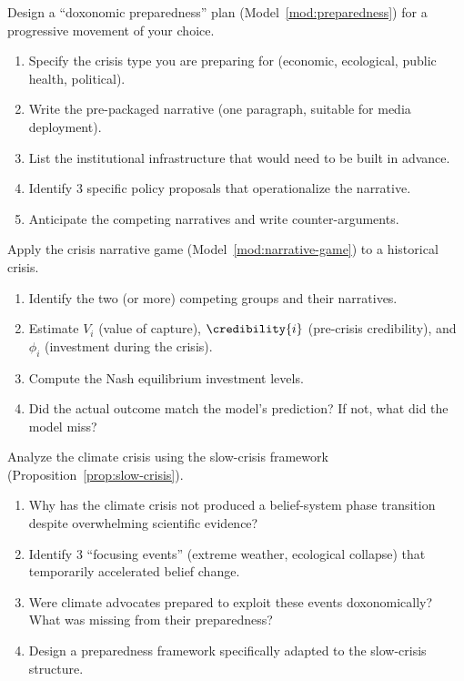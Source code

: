 \begin{exercise}
Design a ``doxonomic preparedness'' plan (Model~\ref{mod:preparedness}) for a progressive movement of your choice.
\begin{enumerate}[nosep]
  \item Specify the crisis type you are preparing for (economic, ecological, public health, political).
  \item Write the pre-packaged narrative (one paragraph, suitable for media deployment).
  \item List the institutional infrastructure that would need to be built in advance.
  \item Identify 3 specific policy proposals that operationalize the narrative.
  \item Anticipate the competing narratives and write counter-arguments.
\end{enumerate}
\end{exercise}

\begin{exercise}
Apply the crisis narrative game (Model~\ref{mod:narrative-game}) to a historical crisis.
\begin{enumerate}[nosep]
  \item Identify the two (or more) competing groups and their narratives.
  \item Estimate $V_i$ (value of capture), $\credibility{i}$ (pre-crisis credibility), and $\phi_i$ (investment during the crisis).
  \item Compute the Nash equilibrium investment levels.
  \item Did the actual outcome match the model's prediction? If not, what did the model miss?
\end{enumerate}
\end{exercise}

\begin{exercise}
Analyze the climate crisis using the slow-crisis framework (Proposition~\ref{prop:slow-crisis}).
\begin{enumerate}[nosep]
  \item Why has the climate crisis not produced a belief-system phase transition despite overwhelming scientific evidence?
  \item Identify 3 ``focusing events'' (extreme weather, ecological collapse) that temporarily accelerated belief change.
  \item Were climate advocates prepared to exploit these events doxonomically? What was missing from their preparedness?
  \item Design a preparedness framework specifically adapted to the slow-crisis structure.
\end{enumerate}
\end{exercise}

